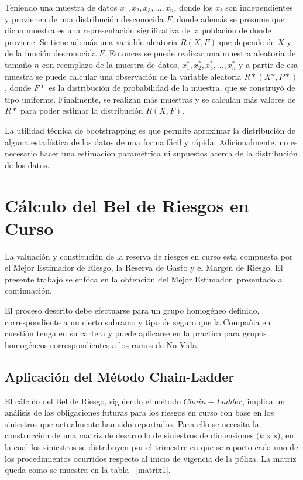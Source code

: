 \documentclass[11pt,twoside,openright,spanish]{report}
\numberwithin{equation}{chapter}
\numberwithin{figure}{chapter}
\numberwithin{table}{chapter}
\begin{document}
	Teniendo una muestra de datos $x_{1},x_{2},x_{3},...,x_{n}$, donde los $x_{i}$ son independientes y provienen de una distribución desconocida $F$, donde además se presume que dicha muestra es una representación significativa de la población de donde proviene. Se tiene además una variable aleatoria $R(X,F)$ que depende de $X$ y de la función desconocida $F$. Entonces se puede realizar una muestra aleatoria de tamaño $n$ con reemplazo de la muestra de datos, $x_{1}^{*},x_{2}^{*},x_{3}^{*},...,x_{n}^{*}$ y a partir de esa muestra se puede calcular una observación de la variable aleatoria $R*(X*,P*)$, donde $F*$ es la distribución de probabilidad de la muestra, que se construyó de tipo uniforme. Finalmente, se realizan más muestras y se calculan más valores de $R*$ para poder estimar la distribución $R(X,F)$.

	La utilidad técnica de bootstrapping es que permite aproximar la distribución de alguna estadística de los datos de una forma fácil y rápida. Adicionalmente, no es necesario hacer una estimación paramétrica ni supuestos acerca de la distribución de los datos.
	
	


		
	\chapter{Cálculo del Bel de Riesgos en Curso}

 La valuación y constitución de la reserva de riesgos en curso esta compuesta por el Mejor Estimador de Riesgo, la Reserva de Gasto y el Margen de Riesgo. El presente trabajo se enfóca en la obtención del Mejor Estimador, presentado a continuación.
 
 El proceso descrito debe efectuarse para un grupo homogéneo definido, correspondiente a un cierto subramo y tipo de seguro que la Compañia en cuestión tenga en su cartera y puede aplicarse en la practica para grupos homogéneos correspondientes a los ramos de No Vida.

	\section{Aplicación del Método Chain-Ladder}
	
	El cálculo del Bel de Riesgo, siguiendo el método $Chain-Ladder$, implica un análisis de las obligaciones futuras para los riesgos en curso con base en los siniestros que actualmente han sido reportados. Para ello se necesita la construcción de una matriz de desarrollo de siniestros  de dimensiones $(k$ x $s)$, en la cual los siniestros se distribuyen por el trimestre en que se reporto cada uno de los procedimientos ocurridos respecto al inicio de vigencia de la póliza. La matriz queda como se muestra en la tabla ~\ref{matrix1}.
\end{document}
